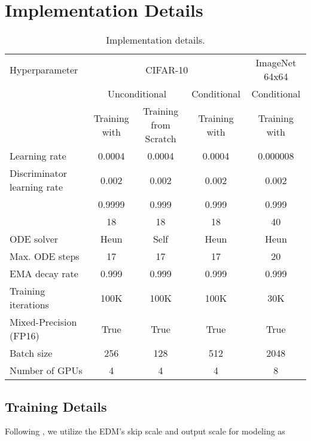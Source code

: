 \documentclass{article} \usepackage{iclr2024_coNFErence,times}
\theoremstyle{definition}
\theoremstyle{remark}
\begin{document}
\section{Implementation Details}\label{sec:implementation}

\begin{table}[t]
	\caption{Implementation details.}
	\label{tab:implementation}
	\scriptsize
	\centering
	\begin{tabular}{lcccc}
		\toprule
		Hyperparameter & \multicolumn{3}{c}{CIFAR-10} & ImageNet 64x64 \\\cmidrule(lr){2-4}\cmidrule(lr){5-5}
        & \multicolumn{2}{c}{Unconditional} & Conditional & Conditional \\\cmidrule(lr){2-3}\cmidrule(lr){4-4}\cmidrule(lr){5-5}
        & Training with  & Training from Scratch & Training with  & Training with  \\\cmidrule(lr){1-1}\cmidrule(lr){2-2}\cmidrule(lr){3-3}\cmidrule(lr){4-4}\cmidrule(lr){5-5}
        Learning rate & 0.0004 & 0.0004 & 0.0004 & 0.000008 \\
        Discriminator learning rate & 0.002 & 0.002 & 0.002 & 0.002 \\
         & 0.9999 & 0.999 & 0.999 & 0.999 \\
         & 18 & 18 & 18 & 40 \\
        ODE solver & Heun & Self & Heun & Heun \\
        Max. ODE steps & 17 & 17 & 17 & 20 \\
        EMA decay rate & 0.999 & 0.999 & 0.999 & 0.999 \\
        Training iterations & 100K & 100K & 100K & 30K \\
        Mixed-Precision (FP16) & True & True & True & True \\
        Batch size & 256 & 128 & 512 & 2048 \\
        Number of GPUs & 4 & 4 & 4 & 8 \\
            \bottomrule
	\end{tabular}
\end{table}

\subsection{Training Details}\label{appendix:training_details}

Following \citet{karras2022elucidating}, we utilize the EDM's skip scale and output scale for  modeling as
\end{document}
